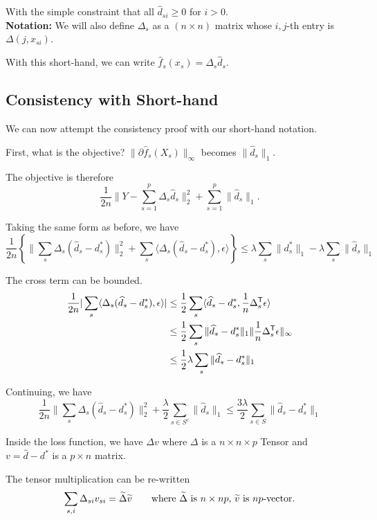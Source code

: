\documentclass{article}
\begin{document}
With the simple constraint that all $\hat{d}_{si} \geq 0$ for $i > 0$.\\

\textbf{Notation:} We will also define $\Delta_s$ as a $(n \times n)$ matrix whose $i,j$-th entry is $\Delta(j, x_{si})$. 

With this short-hand, we can write $\hat{f}_s(x_s) = \Delta_s\hat{d}_s$.

\subsection{Consistency with Short-hand}

We can now attempt the consistency proof with our short-hand notation.

First, what is the objective? $\| \partial \hat{f}_s(X_s) \|_\infty$ becomes $\| \hat{d}_s \|_1$. 

The objective is therefore
\[
\frac{1}{2n} \| Y - \sum_{s=1}^p \Delta_s \hat{d}_s \|_2^2 + \sum_{s=1}^p \|\hat{d}_s \|_1 .
\]

Taking the same form as before, we have
\[
\frac{1}{2n} \left\{ 
  \| \sum_s \Delta_s ( \hat{d}_s - d^*_s) \|_2^2 +
\sum_s \langle \Delta_s ( \hat{d}_s - d^*_s) , \epsilon \rangle \right\} \leq
\lambda \sum_s \|d^*_s \|_1 - \lambda \sum_s \|\hat{d}_s \|_1
\]

The cross term can be bounded.
\begin{align*}
\frac{1}{2n} |\sum_s \langle \Delta_s ( \widehat{d}_s - d^*_s), \epsilon \rangle| &\leq  \frac{1}{2} \sum_s \langle \widehat{d}_s - d^*_s, \frac{1}{n}\Delta_s^{\mathsf{T}} \epsilon \rangle \\
&\leq \frac{1}{2} \sum_s \| \widehat{d}_s - d_s^* \|_1 \| \frac{1}{n}\Delta_s^{\mathsf{T}} \epsilon \|_\infty \\
&\leq \frac{1}{2} \lambda \sum_s \| \widehat{d}_s - d_s^* \|_1
\end{align*}

Continuing, we have
\[
\frac{1}{2n}\| \sum_s \Delta_s ( \hat{d}_s - d^*_s) \|_2^2 + \frac{\lambda}{2} \sum_{s \in S^c} \| \hat{d}_s \|_1 \leq \frac{3\lambda}{2} \sum_{s \in S} \| \hat{d}_s - d^*_s \|_1  
\]

Inside the loss function, we have $\Delta v$ where $\Delta$ is a $n \times n \times p$ Tensor and $v = \hat{d} - d^*$ is a $p \times n$ matrix. 

The tensor multiplication can be re-written 
\[
\sum_{s,i} \Delta_{si} v_{si} = \widetilde{\Delta} \widetilde{v} \qquad \textrm{where $\widetilde{\Delta}$ is $n \times np$, $\widetilde{v}$ is $np$-vector.}
\]
\end{document}
